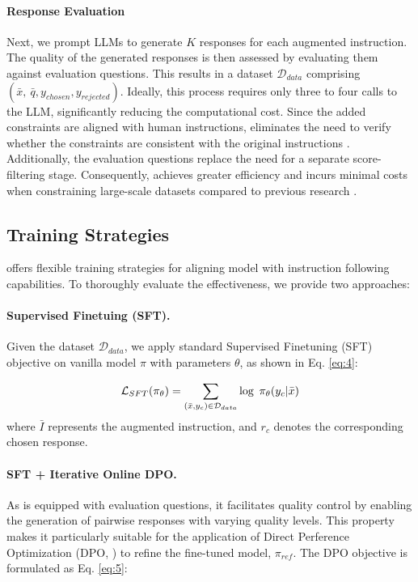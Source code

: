 \paragraph{Response Evaluation}
Next, we prompt LLMs to generate $K$ responses for each augmented instruction. The quality of the generated responses is then assessed by evaluating them against evaluation questions. This results in a dataset $\mathcal{D}_{data}$ comprising  $(\bar{x},\ \bar{q}, y_{chosen}, y_{rejected})$.
Ideally, this process requires only three to four calls to the LLM, significantly reducing the computational cost. 
Since the added constraints are aligned with human instructions, \method eliminates the need to verify whether the constraints are consistent with the original instructions \citep{dong2024self,katz2024evolutionary}. Additionally, the evaluation questions replace the need for a separate score-filtering stage. Consequently, \method achieves greater efficiency and incurs minimal costs when constraining large-scale datasets compared to previous research \citep{xu2023wizardlm, dong2024self}.


\subsection{Training Strategies}
\label{sec:strategy}

\method offers flexible training strategies for aligning model with instruction following capabilities. To thoroughly evaluate the effectiveness, we provide two approaches:

\paragraph{Supervised Finetuing (SFT).}
Given the dataset $\mathcal{D}_{data}$, we apply standard Supervised Finetuning (SFT) objective on vanilla model $\pi$ with parameters $\theta$, as shown in Eq. \ref{eq:4}: 

\begin{equation}
\label{eq:4}
    \small
    \mathcal{L}_{SFT}(\pi_\theta)=\sum_{(\bar{x}, y_{c})\in \mathcal{D}_{data}} \log\ \pi_{\theta}(y_{c}|\bar{x})
\end{equation}
where $\bar{I}$ represents the augmented instruction, and $r_{c}$ denotes the corresponding chosen response.

\paragraph{SFT + Iterative Online DPO.} As \method is equipped with evaluation questions, it facilitates quality control by enabling the generation of pairwise responses with varying quality levels. This property makes it particularly suitable for the application of Direct Perference Optimization (DPO, \citet{rafailov2024direct}) to refine the fine-tuned model, $\pi_{ref}$. The DPO objective is formulated as Eq. \ref{eq:5}:

